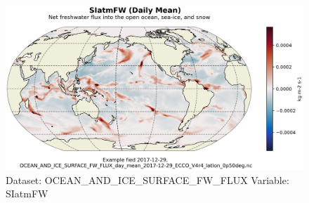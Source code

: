 \begin{figure}[H]
\centering
\includegraphics[scale=0.55]{../images/plots/latlon_plots/Ocean_and_Sea-Ice_Surface_Freshwater_Fluxes/SIatmFW.png}
\caption{Dataset: OCEAN\_AND\_ICE\_SURFACE\_FW\_FLUX Variable: SIatmFW}
\label{tab:table-OCEAN_AND_ICE_SURFACE_FW_FLUX_SIatmFW-Plot}
\end{figure}
\pagebreak
